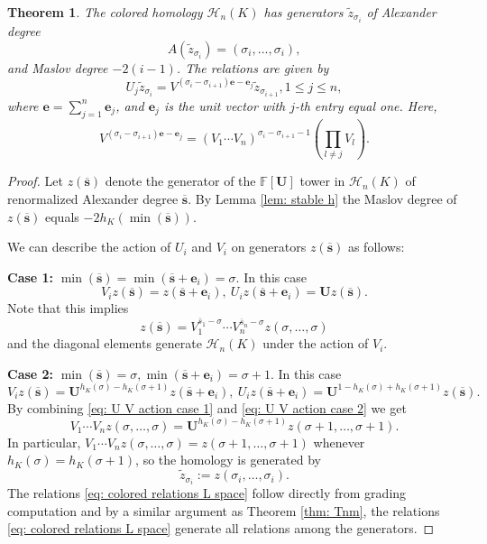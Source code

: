 \documentclass{amsart}
\newtheorem{theorem}{Theorem}[section]
\newcommand{\CH}{\mathcal{H}}
\newcommand{\F}{\mathbb{F}}
\newcommand{\ee}{\mathbf{e}}
\newcommand{\UU}{\mathbf{U}}
\renewcommand{\ss}{\mathbf{s}}
\begin{document}
\begin{theorem}
\label{thm: colored L space}
The colored homology $\CH_{n}(K)$ has generators 
$\widetilde{z}_{\sigma_i}$ of Alexander degree
$$
A\left(\widetilde{z}_{\sigma_i}\right)=(\sigma_i,\ldots,\sigma_i),
$$
and Maslov degree $-2(i-1)$. The relations are given by
\begin{equation}
\label{eq: colored relations L space}
U_j\widetilde{z}_{\sigma_i}=V^{(\sigma_i-\sigma_{i+1})\ee-\ee_j}\widetilde{z}_{\sigma_{i+1}}, 1\le j\le n,
\end{equation}
where $\ee=\sum_{j=1}^n\ee_j$, and $\ee_j$ is the unit vector with $j$-th entry equal one. Here, $$V^{(\sigma_i-\sigma_{i+1})\ee-\ee_j}=(V_1\cdots V_n)^{\sigma_i-\sigma_{i+1}-1}\left(\prod_{l\neq j}V_l\right).$$
\end{theorem}

\begin{proof}
Let $z(\overline{\ss})$ denote the generator of the $\F[\UU]$ tower in $\CH_{n}(K)$ of renormalized Alexander degree $\overline{\ss}$. By Lemma \ref{lem: stable h} the Maslov degree of  $z(\overline{\ss})$ equals $-2h_K(\min(\overline{\ss}))$.

We can describe the action of $U_i$ and $V_i$ on generators $z(\overline{\ss})$ as follows:

{\bf Case 1:} $\min(\overline{\ss})=\min(\overline{\ss}+\ee_i)=\sigma$. In this case 
\begin{equation}
\label{eq: U V action case 1}
V_iz(\overline{\ss})=z(\overline{\ss}+\ee_i),\ U_iz(\overline{\ss}+\ee_i)=\UU z(\overline{\ss}).
\end{equation}
Note that this implies
$$
z(\overline{\ss})=V_1^{\overline{s}_1-\sigma}\cdots V_n^{\overline{s}_n-\sigma}z(\sigma,\ldots,\sigma)
$$
and the diagonal elements generate $\CH_{n}(K)$ under the action of $V_i$. 

{\bf Case 2:}
$\min(\overline{\ss})=\sigma,\min(\overline{\ss}+\ee_i)=\sigma+1$. In this case
\begin{equation}
\label{eq: U V action case 2}
V_iz(\overline{\ss})=\UU^{h_K(\sigma)-h_K(\sigma+1)}z(\overline{\ss}+\ee_i),\ U_iz(\overline{\ss}+\ee_i)=\UU^{1-h_K(\sigma)+h_K(\sigma+1)}z(\overline{\ss}).
\end{equation}
By combining \eqref{eq: U V action case 1} and \eqref{eq: U V action case 2} we get 
$$
V_1\cdots V_nz(\sigma,\ldots,\sigma)=\UU^{h_K(\sigma)-h_K(\sigma+1)}z(\sigma+1,\ldots,\sigma+1).
$$
In particular, $
V_1\cdots V_nz(\sigma,\ldots,\sigma)=z(\sigma+1,\ldots,\sigma+1)$ whenever $h_K(\sigma)=h_K(\sigma+1)$, so the homology is generated by 
$$
\widetilde{z}_{\sigma_i}:=z(\sigma_i,\ldots,\sigma_i).
$$
The relations \eqref{eq: colored relations L space} follow directly from grading computation and by a similar argument as Theorem \ref{thm: Tnm}, the relations \eqref{eq: colored relations L space} generate all relations among the generators. 


\end{proof}
\end{document}
